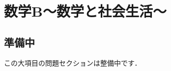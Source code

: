 \documentclass[../../ms_q.tex]{subfiles}
\begin{document}
\section{数学B～数学と社会生活～}

\subsection*{準備中}
この大項目の問題セクションは整備中です．
\end{document}
